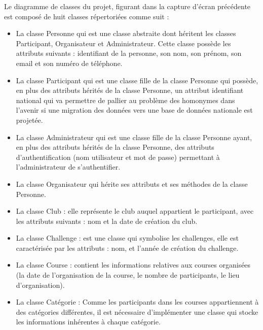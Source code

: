 \newpage
Le diagramme de classes du projet, figurant dans la capture d’écran précédente est composé de huit classes répertoriées comme suit :
\begin{itemize} 
 	\item La classe Personne qui est une classe abstraite dont héritent les classes Participant, Organisateur et Administrateur. Cette classe possède les attributs suivants : identifiant de la personne, son nom, son prénom, son email et son numéro de téléphone.
 	\item La classe Participant qui est une classe fille de la classe Personne qui possède, en plus des attributs hérités de la classe Personne, un attribut identifiant national qui va permettre de pallier au problème des homonymes dans l’avenir si une migration des données vers une base de données nationale est projetée.
 	\item La classe Administrateur qui est une classe fille de la classe Personne ayant, en plus des attributs hérités de la classe Personne, des attributs d’authentification (nom utilisateur et mot de passe) permettant à l’administrateur de s’authentifier. 
 	\item La classe Organisateur qui hérite ses attributs et ses méthodes de la classe Personne.
 	\item La classe Club : elle représente le club auquel appartient le participant, avec les attributs suivants : nom et la date de création du club.
 	\item La classe Challenge : est une classe qui symbolise les challenges, elle est caractérisée par les attributs : nom, et l’année de création du challenge.
 	\item La classe Course : contient les informations relatives aux courses organisées (la date de l’organisation de la course, le nombre de participants, le lieu d’organisation).
 	\item La classe Catégorie : Comme les participants dans les courses appartiennent à des catégories différentes, il est nécessaire d’implémenter une classe qui stocke les informations inhérentes à chaque catégorie. 
\end{itemize} 
